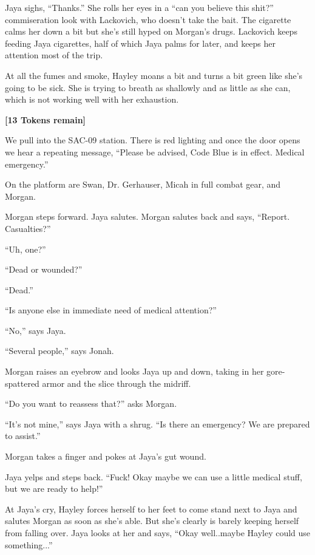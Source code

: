 Jaya sighs, ``Thanks.'' She rolls her eyes in a ``can you believe this shit?'' commiseration look with Lackovich, who doesn't take the bait.  The cigarette calms her down a bit but she's still hyped on Morgan's drugs.  Lackovich keeps feeding Jaya cigarettes, half of which Jaya palms for later, and keeps her attention most of the trip.

At all the fumes and smoke, Hayley moans a bit and turns a bit green like she's going to be sick. She is trying to breath as shallowly and as little as she can, which is not working well with her exhaustion.



\textbf{{[}13 Tokens remain{]}}





We pull into the SAC-09 station.  There is red lighting and once the door opens we hear a repeating message, ``Please be advised, Code Blue is in effect.  Medical emergency.''

On the platform are Swan, Dr. Gerhauser, Micah in full combat gear, and Morgan.



Morgan steps forward.  Jaya salutes.  Morgan salutes back and says, ``Report.  Casualties?''

``Uh, one?''

``Dead or wounded?''

``Dead.''

``Is anyone else in immediate need of medical attention?''

``No,'' says Jaya.

``Several people,'' says Jonah.

Morgan raises an eyebrow and looks Jaya up and down, taking in her gore-spattered armor and the slice through the midriff.

``Do you want to reassess that?'' asks Morgan.

``It's not mine,'' says Jaya with a shrug.  ``Is there an emergency?  We are prepared to assist.''

Morgan takes a finger and pokes at Jaya's gut wound.

Jaya yelps and steps back. ``Fuck!  Okay maybe we can use a little medical stuff, but we are ready to help!''

At Jaya's cry, Hayley forces herself to her feet to come stand next to Jaya and salutes Morgan as soon as she's able.  But she's clearly is barely keeping herself from falling over.  Jaya looks at her and says, ``Okay well..maybe Hayley could use something...''

